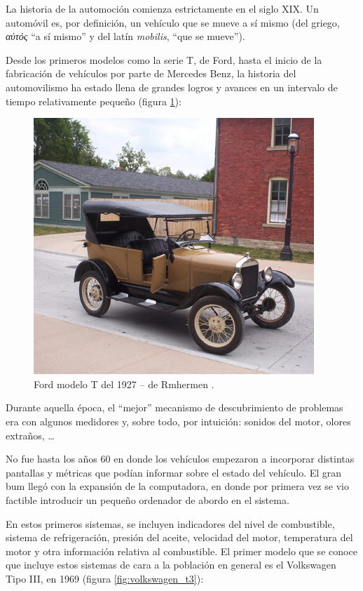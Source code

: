 La historia de la automoción comienza estrictamente en el siglo XIX.
Un automóvil es, por definición, un vehículo que se mueve a sí mismo
(del griego, \textit{αὐτός} ``a sí mismo'' y del latín \textit{mobilis},
``que se mueve'').

Desde los primeros modelos como la serie T, de Ford, hasta el inicio de
la fabricación de vehículos por parte de Mercedes Benz, la historia del
automovilismo ha estado llena de grandes logros y avances en un intervalo
de tiempo relativamente pequeño (figura \ref{fig:ford_model_t}):

\begin{figure}[H]
  \centering
  \includegraphics[width=.8\linewidth]{images/Late_model_Ford_Model_T.jpg}
  \caption{Ford modelo T del 1927 -- de Rmhermen \cite{Ford2022}.}
  \label{fig:ford_model_t}
\end{figure}

Durante aquella época, el ``mejor'' mecanismo de descubrimiento de
problemas era con algunos medidores y, sobre todo, por intuición:
sonidos del motor, olores extraños, \dots

No fue hasta los años 60 en donde los vehículos empezaron a incorporar
distintas pantallas y métricas que podían informar sobre el estado del
vehículo. El gran bum llegó con la expansión de la computadora, en donde
por primera vez se vio factible introducir un pequeño ordenador de 
abordo en el sistema.

En estos primeros sistemas, se incluyen indicadores del nivel de combustible,
sistema de refrigeración, presión del aceite, velocidad del motor,
temperatura del motor y otra información relativa al combustible. El
primer modelo que se conoce que incluye estos sistemas de cara a la
población en general es el Volkswagen Tipo III, en 1969 (figura \ref{fig:volkswagen_t3}):

